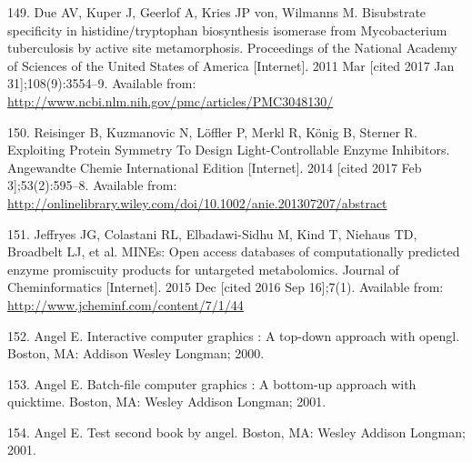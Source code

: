 \documentclass[12pt,twoside]{reedthesis}
\begin{document}
  \hypertarget{ref-due_bisubstrate_2011}{}
  149. Due AV, Kuper J, Geerlof A, Kries JP von, Wilmanns M. Bisubstrate
  specificity in histidine/tryptophan biosynthesis isomerase from
  Mycobacterium tuberculosis by active site metamorphosis. Proceedings of
  the National Academy of Sciences of the United States of America
  {[}Internet{]}. 2011 Mar {[}cited 2017 Jan 31{]};108(9):3554--9.
  Available from:
  \url{http://www.ncbi.nlm.nih.gov/pmc/articles/PMC3048130/}
  
  \hypertarget{ref-reisinger_exploiting_2014}{}
  150. Reisinger B, Kuzmanovic N, Löffler P, Merkl R, König B, Sterner R.
  Exploiting Protein Symmetry To Design Light-Controllable Enzyme
  Inhibitors. Angewandte Chemie International Edition {[}Internet{]}. 2014
  {[}cited 2017 Feb 3{]};53(2):595--8. Available from:
  \url{http://onlinelibrary.wiley.com/doi/10.1002/anie.201307207/abstract}
  
  \hypertarget{ref-jeffryes_mines_2015}{}
  151. Jeffryes JG, Colastani RL, Elbadawi-Sidhu M, Kind T, Niehaus TD,
  Broadbelt LJ, et al. MINEs: Open access databases of computationally
  predicted enzyme promiscuity products for untargeted metabolomics.
  Journal of Cheminformatics {[}Internet{]}. 2015 Dec {[}cited 2016 Sep
  16{]};7(1). Available from: \url{http://www.jcheminf.com/content/7/1/44}
  
  \hypertarget{ref-angel2000}{}
  152. Angel E. Interactive computer graphics : A top-down approach with
  opengl. Boston, MA: Addison Wesley Longman; 2000.
  
  \hypertarget{ref-angel2001}{}
  153. Angel E. Batch-file computer graphics : A bottom-up approach with
  quicktime. Boston, MA: Wesley Addison Longman; 2001.
  
  \hypertarget{ref-angel2002a}{}
  154. Angel E. Test second book by angel. Boston, MA: Wesley Addison
  Longman; 2001.


\end{document}
